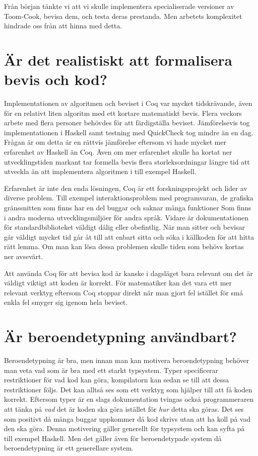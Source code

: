 Från början tänkte vi att vi skulle implementera specialiserade versioner av
Toom-Cook, bevisa dem, och testa deras prestanda. Men arbetets komplexitet
hindrade oss från att hinna med detta.

\section{Är det realistiskt att formalisera bevis och kod?}
Implementationen av algoritmen och beviset i Coq var mycket tidskrävande, även
för en relativt liten algoritm med ett kortare matematiskt bevis. Flera veckors
arbete med flera personer behövdes för att färdigställa beviset. Jämförelsevis
tog implementationen i Haskell samt testning med QuickCheck tog mindre än en
dag. Frågan är om detta är en rättvis jämförelse eftersom vi hade mycket mer
erfarenhet av Haskell än Coq. Även om mer erfarenhet skulle ha kortat ner
utvecklingstiden markant tar formella bevis flera storleksordningar längre tid
att utveckla än att implementera algoritmen i till exempel Haskell.

Erfarenhet är inte den enda lösningen, Coq är ett forskningsprojekt och lider
av diverse problem. Till exempel interaktionsproblem med programvaran, de
grafiska gränssnitten som finns har en del buggar och saknar många funktioner
Som finns i andra moderna utvecklingsmiljöer för andra språk. Vidare är
dokumentationen för standardbiblioteket väldigt dålig eller obefintlig. När man
sitter och bevisar går väldigt mycket tid går åt till att enbart sitta och söka
i källkoden för att hitta rätt lemma. Om man kan lösa dessa problemen skulle
tiden som behövs kortas ner avsevärt.

Att använda Coq för att bevisa kod är kanske i dagsläget bara relevant om det
är väldigt viktigt att koden är korrekt. För matematiker kan det vara ett mer
relevant verktyg eftersom Coq stoppar direkt när man gjort fel istället för små
enkla fel smyger sig igenom hela beviset.

\section{Är beroendetypning användbart?}
Beroendetypning är bra, men innan man kan motivera beroendetypning behöver man
veta vad som är bra med ett starkt typsystem.
Typer specificerar restriktioner för vad kod kan göra, kompilatorn kan sedan se
till att dessa restriktioner följs. Det kan alltså ses som ett verktyg som
hjälper till att få koden korrekt. Eftersom typer är en slags dokumentation
tvingas också programmeraren att tänka på
\emph{vad} det är koden ska göra istället för \emph{hur} detta ska göras. Det
ses som positivt då många buggar uppkommer då kod skrivs utan att ha koll på
vad den ska göra. Denna motivering gäller generellt för typsystem och kan syfta
på till exempel Haskell. Men det gäller även för beroendetypade system då
beroendetypning är ett generellare system.

